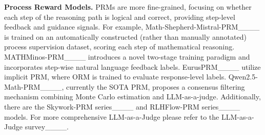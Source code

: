 \textbf{Process Reward Models.} PRMs are more fine-grained, focusing on whether each step of the reasoning path is logical and correct, providing step-level feedback and guidance signals. For example, Math-Shepherd-Mistral-PRM____ is trained on an automatically constructed (rather than manually annotated) process supervision dataset, scoring each step of mathematical reasoning. MATHMinos-PRM____ introduces a novel two-stage training paradigm and incorporates step-wise natural language feedback labels. EurusPRM____ utilize implicit PRM, where ORM is trained to evaluate response-level labels. Qwen2.5-Math-PRM____, currently the SOTA PRM, proposes a consensus filtering mechanism combining Monte Carlo estimation and LLM-as-a-judge. Additionally, there are the Skywork-PRM series____ and RLHFlow-PRM series____ models. For more comprehensive LLM-as-a-Judge please refer to the LLM-as-a-Judge survey____.
